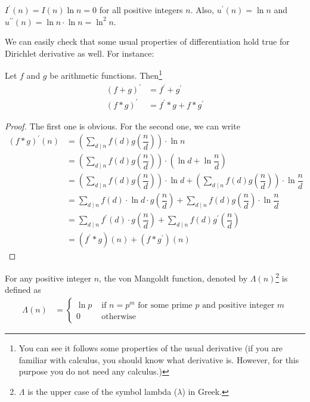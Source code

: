 \documentclass{subfile}
\begin{document}
	\begin{example}
		$I^\prime(n)=I(n)\ln n=0$ for all positive integers $n$. Also, $u^\prime(n)=\ln n$ and $u^{\prime\prime}(n)=\ln n\cdot\ln n=\ln^2 n$.
	\end{example}
We can easily check that some usual properties of differentiation hold true for Dirichlet derivative as well. For instance:
	\begin{proposition}
		Let $f$ and $g$ be arithmetic functions. Then\footnote{You can see it follows some properties of the usual derivative (if you are familiar with calculus, you should know what derivative is. However, for this purpose you do not need any calculus.)}
			\begin{align*}
				(f+g)^\prime & =f^\prime+g^\prime\\
				(f\ast g)^\prime& =f^\prime \ast g + f\ast g^\prime
			\end{align*}
	\end{proposition}
	\begin{proof}
		The first one is obvious. For the second one, we can write
			\begin{align*}
				(f\ast g)^\prime (n)
					&= \left(\sum_{d\mid n} f(d)g\left(\dfrac{n}{d}\right)\right) \cdot \ln n\\
					&= \left(\sum_{d\mid n} f(d)g\left(\dfrac{n}{d}\right)\right) \cdot \left(\ln d + \ln \dfrac{n}{d}\right)\\
					&= \left(\sum_{d\mid n} f(d)g\left(\dfrac{n}{d}\right)\right) \cdot \ln d + \left(\sum_{d\mid n} f(d)g\left(\dfrac{n}{d}\right)\right) \cdot \ln \dfrac{n}{d}\\
					&= \sum_{d\mid n} f(d)\cdot \ln d \cdot g\left(\dfrac{n}{d}\right)+ \sum_{d\mid n} f(d) g\left(\dfrac{n}{d}\right) \cdot \ln \dfrac{n}{d}\\
					&= \sum_{d\mid n} f^\prime(d) \cdot g\left(\dfrac{n}{d}\right)+ \sum_{d\mid n} f(d) g^\prime\left(\dfrac{n}{d}\right)\\
					&= (f^\prime \ast g)(n) + (f\ast g^\prime)(n)
			\end{align*}

	\end{proof}
	\begin{definition}
		For any positive integer $n$, the von Mangoldt function, denoted by $\Lambda(n)$\footnote{$\Lambda$ is the upper case of the symbol lambda ($\lambda$) in Greek.} is defined as
			\begin{align*}
				\Lambda(n) & =
					\begin{cases}\ln p &\mbox{ if }n=p^m\mbox{ for  some prime }p\mbox{ and positive integer }m\\0&\mbox{ otherwise}\end{cases}
			\end{align*}
	\end{definition}
\end{document}
